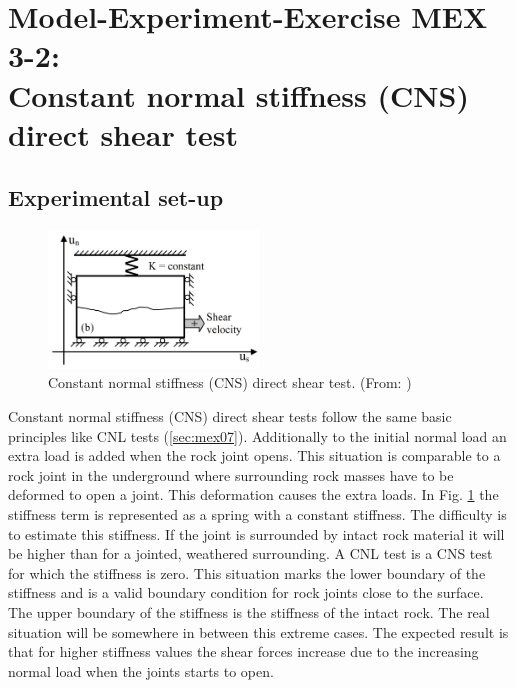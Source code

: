 \section[MEX 3-2: CNS direct shear test]{Model-Experiment-Exercise MEX 3-2:\\Constant normal stiffness (CNS) direct shear test}
\label{sec:mex08}
\subsection{Experimental set-up}
\begin{figure}[!ht]
\begin{center}
\includegraphics[width=0.5\textwidth]{./figures/MEX8_CNS_Nguyen_Thesis.PNG}
\end{center}
\caption{Constant normal stiffness (CNS) direct shear test. (From: \cite{Nguyen2014})}
\label{fig:MEX8_CNS}
\end{figure}

Constant normal stiffness (CNS) direct shear tests follow the same basic principles like CNL tests (\ref{sec:mex07}). Additionally to the initial normal load an extra load is added when the rock joint opens. This situation is comparable to a rock joint in the underground where surrounding rock masses have to be deformed to open a joint. This deformation causes the extra loads. In Fig. \ref{fig:MEX8_CNS} the stiffness term is represented as a spring with a constant stiffness. The difficulty is to estimate this stiffness. If the joint is surrounded by intact rock material it will be higher than for a jointed, weathered surrounding. A CNL test is a CNS test for which the stiffness is zero. This situation marks the lower boundary of the stiffness and is a valid boundary condition for rock joints close to the surface. The upper boundary of the stiffness is the stiffness of the intact rock. The real situation will be somewhere in between this extreme cases.
%
The expected result is that for higher stiffness values the shear forces increase due to the increasing normal load when the joints starts to open.

